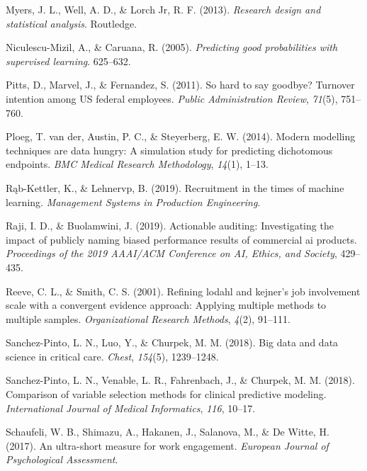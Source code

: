 \documentclass[
  man]{apa7}
\newlength{\cslhangindent}
\newenvironment{CSLReferences}[2] %
 {\begin{list}{}{%
  \setlength{\itemindent}{0pt}
  \setlength{\leftmargin}{0pt}
  \setlength{\parsep}{0pt}
  \ifodd #1
   \setlength{\leftmargin}{\cslhangindent}
   \setlength{\itemindent}{-1\cslhangindent}
  \fi
  \setlength{\itemsep}{#2\baselineskip}}}
 {\end{list}}
\begin{document}
\begin{CSLReferences}{1}{0}
Myers, J. L., Well, A. D., \& Lorch Jr, R. F. (2013). \emph{Research design and statistical analysis}. Routledge.

Niculescu-Mizil, A., \& Caruana, R. (2005). \emph{Predicting good probabilities with supervised learning}. 625--632.

Pitts, D., Marvel, J., \& Fernandez, S. (2011). So hard to say goodbye? Turnover intention among US federal employees. \emph{Public Administration Review}, \emph{71}(5), 751--760.

Ploeg, T. van der, Austin, P. C., \& Steyerberg, E. W. (2014). Modern modelling techniques are data hungry: A simulation study for predicting dichotomous endpoints. \emph{BMC Medical Research Methodology}, \emph{14}(1), 1--13.

Rąb-Kettler, K., \& Lehnervp, B. (2019). Recruitment in the times of machine learning. \emph{Management Systems in Production Engineering}.

Raji, I. D., \& Buolamwini, J. (2019). Actionable auditing: Investigating the impact of publicly naming biased performance results of commercial ai products. \emph{Proceedings of the 2019 AAAI/ACM Conference on AI, Ethics, and Society}, 429--435.

Reeve, C. L., \& Smith, C. S. (2001). Refining lodahl and kejner's job involvement scale with a convergent evidence approach: Applying multiple methods to multiple samples. \emph{Organizational Research Methods}, \emph{4}(2), 91--111.

Sanchez-Pinto, L. N., Luo, Y., \& Churpek, M. M. (2018). Big data and data science in critical care. \emph{Chest}, \emph{154}(5), 1239--1248.

Sanchez-Pinto, L. N., Venable, L. R., Fahrenbach, J., \& Churpek, M. M. (2018). Comparison of variable selection methods for clinical predictive modeling. \emph{International Journal of Medical Informatics}, \emph{116}, 10--17.

Schaufeli, W. B., Shimazu, A., Hakanen, J., Salanova, M., \& De Witte, H. (2017). An ultra-short measure for work engagement. \emph{European Journal of Psychological Assessment}.


\end{CSLReferences}
\end{document}
